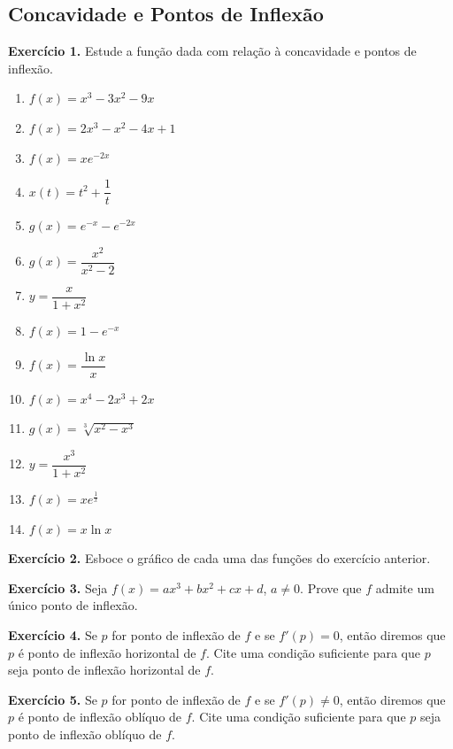 \documentclass[12pt,a4paper]{article}
\begin{document}
\subsection{Concavidade e Pontos de Inflexão}
\vspace{0.5cm}
\noindent\textbf{Exercício 1.} Estude a função dada com relação à concavidade e pontos de inflexão.
\begin{enumerate}
    \renewcommand{\theenumi}{\alph{enumi}}
    \renewcommand{\labelenumi}{\theenumi)}
    \item $f(x) = x^3 - 3x^2 - 9x$
    \item $f(x) = 2x^3 - x^2 - 4x + 1$
    \item $f(x) = xe^{-2x}$
    \item $x(t) = t^2 + \dfrac{1}{t}$
    \item $g(x) = e^{-x} - e^{-2x}$
    \item $g(x) = \dfrac{x^2}{x^2 - 2}$
    \item $y = \dfrac{x}{1 + x^2}$
    \item $f(x) = 1 - e^{-x}$
    \item $f(x) = \dfrac{\ln x}{x}$
    \item $f(x) = x^4 - 2x^3 + 2x$
    \item $g(x) = \sqrt[3]{x^2 - x^3}$
    \item $y = \dfrac{x^3}{1 + x^2}$
    \item $f(x) = xe^{\frac{1}{x}}$
    \item $f(x) = x \ln x$
\end{enumerate}

\vspace{0.5cm}
\noindent\textbf{Exercício 2.} Esboce o gráfico de cada uma das funções do exercício anterior.

\vspace{0.5cm}
\noindent\textbf{Exercício 3.} Seja $f(x) = ax^3 + bx^2 + cx + d$, $a \neq 0$. Prove que $f$ admite um único ponto de inflexão.

\vspace{0.5cm}
\noindent\textbf{Exercício 4.} Se $p$ for ponto de inflexão de $f$ e se $f'(p) = 0$, então diremos que $p$ é ponto de inflexão horizontal de $f$. Cite uma condição suficiente para que $p$ seja ponto de inflexão horizontal de $f$.

\vspace{0.5cm}
\noindent\textbf{Exercício 5.} Se $p$ for ponto de inflexão de $f$ e se $f'(p) \neq 0$, então diremos que $p$ é ponto de inflexão oblíquo de $f$. Cite uma condição suficiente para que $p$ seja ponto de inflexão oblíquo de $f$.
\end{document}
